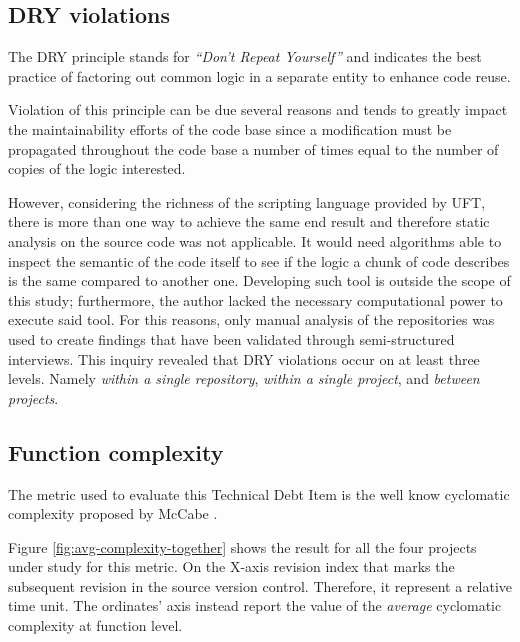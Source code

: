 \subsection{DRY violations}
    The DRY principle stands for \textit{``Don't Repeat Yourself''} and indicates the best practice of factoring out common logic in a separate entity to enhance code reuse.

    Violation of this principle can be due several reasons and tends to greatly impact the maintainability efforts of the code base since a modification must be propagated throughout the code base a number of times equal to the number of copies of the logic interested.

    However, considering the richness of the scripting language provided by UFT, there is more than one way to achieve the same end result and therefore static analysis on the source code was not applicable. It would need algorithms able to inspect the semantic of the code itself to see if the logic a chunk of code describes is the same compared to another one. Developing such tool is outside the scope of this study; furthermore, the author lacked the necessary computational power to execute said tool. For this reasons, only manual analysis of the repositories was used to create findings that have been validated through semi-structured interviews. This inquiry revealed that DRY violations occur on at least three levels. Namely \textit{within a single repository}, \textit{within a single project}, and \textit{between projects}.
    

\subsection{Function complexity}
    The metric used to evaluate this Technical Debt Item is the well know cyclomatic complexity proposed by McCabe \cite{cyclomatic_complexity}.

    Figure \ref{fig:avg-complexity-together} shows the result for all the four projects under study for this metric. On the X-axis revision index that marks the subsequent revision in the source version control. Therefore, it represent a relative time unit. The ordinates' axis instead report the value of the \textit{average} cyclomatic complexity at function level.

